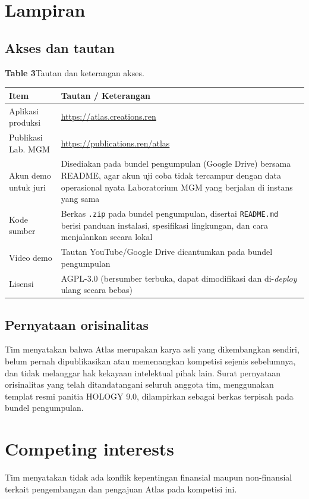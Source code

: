 \section*{Lampiran}

\subsection*{Akses dan tautan}

{\footnotesize\textbf{Table 3}\quad Tautan dan keterangan akses.\par\vspace{2pt}}
\footnotesize
\begin{tabular}{@{}L{2.6cm}L{5.9cm}@{}}
\toprule
\textbf{Item} & \textbf{Tautan / Keterangan} \\
\midrule
Aplikasi produksi & \url{https://atlas.creations.ren} \\
Publikasi Lab. MGM & \url{https://publications.ren/atlas} \\
Akun demo untuk juri & Disediakan pada bundel pengumpulan (Google Drive) bersama README, agar akun uji coba tidak tercampur dengan data operasional nyata Laboratorium MGM yang berjalan di instans yang sama \\
Kode sumber & Berkas \texttt{.zip} pada bundel pengumpulan, disertai \texttt{README.md} berisi panduan instalasi, spesifikasi lingkungan, dan cara menjalankan secara lokal \\
Video demo & Tautan YouTube/Google Drive dicantumkan pada bundel pengumpulan \\
Lisensi & AGPL-3.0 (bersumber terbuka, dapat dimodifikasi dan di-\textit{deploy} ulang secara bebas) \\
\bottomrule
\end{tabular}
\par\vspace{6pt}

\subsection*{Pernyataan orisinalitas}

Tim menyatakan bahwa Atlas merupakan karya asli yang dikembangkan sendiri, belum pernah dipublikasikan atau memenangkan kompetisi sejenis sebelumnya, dan tidak melanggar hak kekayaan intelektual pihak lain. Surat pernyataan orisinalitas yang telah ditandatangani seluruh anggota tim, menggunakan templat resmi panitia HOLOGY 9.0, dilampirkan sebagai berkas terpisah pada bundel pengumpulan.

\section*{Competing interests}
Tim menyatakan tidak ada konflik kepentingan finansial maupun non-finansial terkait pengembangan dan pengajuan Atlas pada kompetisi ini.
